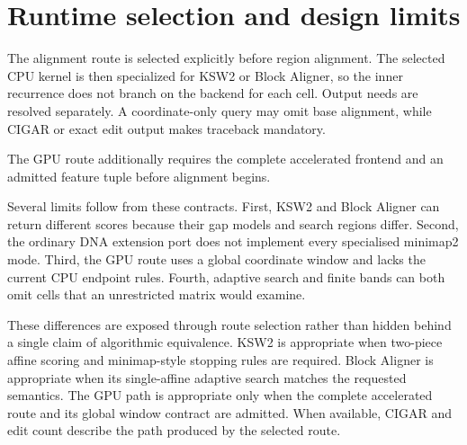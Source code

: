 \section{Runtime selection and design limits}
\label{sec:final-alignment-batching}
\label{sec:final-alignment-decision}

The alignment route is selected explicitly before region alignment. The
selected CPU kernel is then specialized for KSW2 or Block Aligner, so the
inner recurrence does not branch on the backend for each cell. Output needs
are resolved separately. A coordinate-only query may omit base alignment,
while CIGAR or exact edit output makes traceback mandatory.

The GPU route additionally requires the complete accelerated frontend and an
admitted feature tuple before alignment begins.

Several limits follow from these contracts. First, KSW2 and Block Aligner can
return different scores because their gap models and search regions differ.
Second, the ordinary DNA extension port does not implement every specialised
minimap2 mode. Third, the GPU route uses a global coordinate window and lacks
the current CPU endpoint rules. Fourth, adaptive search and finite bands can
both omit cells that an unrestricted matrix would examine.

These differences are exposed through route selection rather than hidden
behind a single claim of algorithmic equivalence. KSW2 is appropriate when
two-piece affine scoring and minimap-style stopping rules are required. Block
Aligner is appropriate when its single-affine adaptive search matches the
requested semantics. The GPU path is appropriate only when the complete
accelerated route and its global window contract are admitted. When available,
CIGAR and edit count describe the path produced by the selected route.
